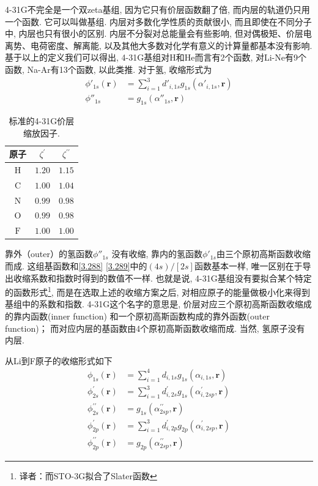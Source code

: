 4-31G不完全是一个双zeta基组, 
因为它只有价层函数翻了倍, 而内层的轨道仍只用一个函数. 
它可以叫做基组. 
内层对多数化学性质的贡献很小, 
而且即使在不同分子中, 内层也只有很小的区别. 
内层不分裂对总能量会有些影响, 
但对偶极矩、价层电离势、电荷密度、解离能, 
以及其他大多数对化学有意义的计算量都基本没有影响. 
基于以上的定义我们可以得出, 
4-31G基组对H和He而言有2个函数, 对Li-Ne有9个函数, Na-Ar有13个函数, 以此类推. 
对于氢, 收缩形式为
\begin{align}
    \phi'_{1s}(\mathbf{r}) & = \sum_{i=1}^3 d'_{i,1s}g_{1s}(\alpha'_{i,1s}, \mathbf{r})
    \\
    \phi''_{1s} & = g_{1s}(\alpha''_{1s},\mathbf{r}) 
\end{align}

\begin{table}[]
    \centering
    \begin{tabular}{ccc}
    \toprule 
    原子         & $\zeta^{\prime}$ & $\zeta^{\prime \prime}$ \\
    \midrule 
    $\mathrm{H}$ & $1.20$ & $1.15$ \\
    $\mathrm{C}$ & $1.00$ & $1.04$ \\
    $\mathrm{N}$ & $0.99$ & $0.98$ \\
    $\mathrm{O}$ & $0.99$ & $0.98$ \\
    $\mathrm{F}$ & $1.00$ & $1.00$ \\
    \bottomrule
    \end{tabular}
    \caption{标准的4-31G价层缩放因子. }
    \label{tab:3.9}
\end{table}

靠外（outer）的氢函数$\phi''_{1s}$ 没有收缩, 
靠内的氢函数$\phi'_{1s}$由三个原初高斯函数收缩而成. 
这组基函数和\autoref{3.288} \autoref{3.289}中的$(4s)/[2s]$函数基本一样, 
唯一区别在于导出收缩系数和指数时得到的数值不一样. 
也就是说, 4-31G基组没有要拟合某个特定的函数形式\footnote{
译者：而STO-3G拟合了Slater函数
}, 
而是在选取上述的收缩方案之后, 
对相应原子的能量做极小化来得到基组中的系数和指数. 
4-31G这个名字的意思是, 
价层对应三个原初高斯函数收缩成的靠内函数(inner function) 
和一个原初高斯函数构成的靠外函数(outer function)；
而对应内层的基函数由4个原初高斯函数收缩而成. 
当然, 氢原子没有内层. 

从Li到F原子的收缩形式如下
\begin{align}
\phi_{1 s}(\mathbf{r}) & = \sum_{i=1}^4 d_{i, 1 s} g_{1 s}\left(\alpha_{i, 1 s}, \mathbf{r}\right) 
\label{eq:3.300}
\\
\phi_{2 s}^{\prime}(\mathbf{r}) & = \sum_{i=1}^3 d_{i, 2 s}^{\prime} g_{1 s}\left(\alpha_{i, 2 s p}^{\prime}, \mathbf{r}\right) \\
\phi_{2 s}^{\prime \prime}(\mathbf{r}) & = g_{1 s}\left(\alpha_{2 s p}^{\prime \prime}, \mathbf{r}\right) \\
\phi_{2 p}^{\prime}(\mathbf{r}) & = \sum_{i=1}^3 d_{i, 2 p}^{\prime} g_{2 p}\left(\alpha_{i, 2 s p}^{\prime}, \mathbf{r}\right) \\
\phi_{2 p}^{\prime \prime}(\mathbf{r}) & = g_{2 p}\left(\alpha_{2 s p}^{\prime \prime}, \mathbf{r}\right)
\label{eq:3.304}
\end{align}

